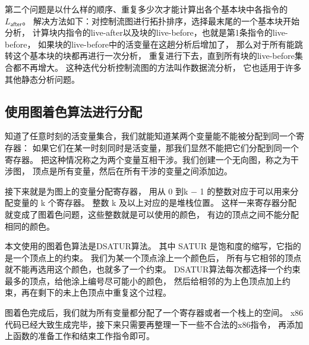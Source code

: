 第二个问题是以什么样的顺序、重复多少次才能计算出各个基本块中各指令的$L_{\mathsf{after}}$。
解决方法如下：对控制流图进行拓扑排序，选择最末尾的一个基本块开始分析，
计算块内指令的live-after以及块的live-before，也就是第1条指令的live-before，
如果块的live-before中的活变量在这趟分析后增加了，
那么对于所有能跳转这个基本块的块都再进行一次分析，
重复进行下去，直到所有块的live-before集合都不再增大。
这种迭代分析控制流图的方法叫作数据流分析\cite{Kildall_1973}，
它也适用于许多其他静态分析问题。
\begin{comment}
下面的代码描述了这一迭代过程。其中\code{trans-G}是转置后的控制流图，
用以计算哪些基本块指向了某一个块，
\code{label->live}是一个字典，用于记录每个基本块的live-before集合。

\begin{lstlisting}
(while (not (queue-empty? worklist))
  (define label (dequeue! worklist))
  (define-values (new-block new-live-before)
    (uncover-live-block (dict-ref blocks label) label->live))
  (hash-set! new-blocks label new-block)
  (unless (equal? new-live-before (hash-ref label->live label))
    (hash-set! label->live label new-live-before)
    (for ([label^ (in-neighbors trans-G label)])
      (enqueue! worklist label^))))
\end{lstlisting}
\end{comment}


\subsection{使用图着色算法进行分配}

知道了任意时刻的活变量集合，我们就能知道某两个变量能不能被分配到同一个寄存器：
如果它们在某一时刻同时是活变量，那我们显然不能把它们分配到同一个寄存器。
把这种情况称之为两个变量互相干涉。我们创建一个无向图，称之为干涉图，
顶点是所有变量，然后在所有干涉的变量之间添加边。

接下来就是为图上的变量分配寄存器，
用从 0 到k − 1 的整数对应于可以用来分配变量的 k 个寄存器。
整数 k 及以上对应的是堆栈位置。
这样一来寄存器分配就变成了图着色问题，这些整数就是可以使用的颜色，
有边的顶点之间不能分配相同的颜色。

本文使用的图着色算法是DSATUR算法\cite{Brélaz_1979}。
其中 SATUR 是饱和度的缩写，它指的是一个顶点上的约束。
我们为某一个顶点涂上一个颜色后，
所有与它相邻的顶点就不能再选用这个颜色，也就多了一个约束。
DSATUR算法每次都选择一个约束最多的顶点，给他涂上编号尽可能小的颜色，
然后给相邻的为上色顶点加上约束，再在剩下的未上色顶点中重复这个过程。

图着色完成后，我们就为所有变量都分配了一个寄存器或者一个栈上的空间。
x86代码已经大致生成完毕，接下来只需要再整理一下一些不合法的x86指令，
再添加上函数的准备工作和结束工作指令即可。
